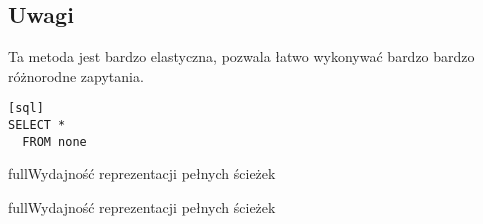 \subsection{Uwagi}

Ta metoda jest bardzo elastyczna, pozwala łatwo wykonywać bardzo bardzo różnorodne zapytania.


\begin{verbatim}[sql]
SELECT *
  FROM none
\end{verbatim}



\begin{qxtab}{full}{Wydajność reprezentacji pełnych ścieżek}
\end{qxtab}

\begin{qxfig}{full}{Wydajność reprezentacji pełnych ścieżek}
\end{qxfig}








